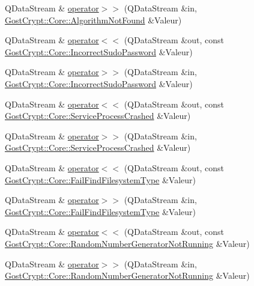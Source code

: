 \begin{DoxyCompactItemize}
\item 
Q\+Data\+Stream \& \hyperlink{namespace_gost_crypt_1_1_core_a18a2f5fd0b2a079c8cbcbccd1177e312}{operator$>$$>$} (Q\+Data\+Stream \&in, \hyperlink{class_gost_crypt_1_1_core_1_1_algorithm_not_found}{Gost\+Crypt\+::\+Core\+::\+Algorithm\+Not\+Found} \&Valeur)
\item 
Q\+Data\+Stream \& \hyperlink{namespace_gost_crypt_1_1_core_acb630df5e59edeeb348987205d80bb44}{operator$<$$<$} (Q\+Data\+Stream \&out, const \hyperlink{class_gost_crypt_1_1_core_1_1_incorrect_sudo_password}{Gost\+Crypt\+::\+Core\+::\+Incorrect\+Sudo\+Password} \&Valeur)
\item 
Q\+Data\+Stream \& \hyperlink{namespace_gost_crypt_1_1_core_a9ef0e1421bd8045e289d3b18faf6408f}{operator$>$$>$} (Q\+Data\+Stream \&in, \hyperlink{class_gost_crypt_1_1_core_1_1_incorrect_sudo_password}{Gost\+Crypt\+::\+Core\+::\+Incorrect\+Sudo\+Password} \&Valeur)
\item 
Q\+Data\+Stream \& \hyperlink{namespace_gost_crypt_1_1_core_aebe7e5d89d4f30fe269355cbec216c97}{operator$<$$<$} (Q\+Data\+Stream \&out, const \hyperlink{class_gost_crypt_1_1_core_1_1_service_process_crashed}{Gost\+Crypt\+::\+Core\+::\+Service\+Process\+Crashed} \&Valeur)
\item 
Q\+Data\+Stream \& \hyperlink{namespace_gost_crypt_1_1_core_a81fbedf03a993369d1f2e0d6d5a954e5}{operator$>$$>$} (Q\+Data\+Stream \&in, \hyperlink{class_gost_crypt_1_1_core_1_1_service_process_crashed}{Gost\+Crypt\+::\+Core\+::\+Service\+Process\+Crashed} \&Valeur)
\item 
Q\+Data\+Stream \& \hyperlink{namespace_gost_crypt_1_1_core_a0d293c1dffa157e3a6f62e0badb1515c}{operator$<$$<$} (Q\+Data\+Stream \&out, const \hyperlink{class_gost_crypt_1_1_core_1_1_fail_find_filesystem_type}{Gost\+Crypt\+::\+Core\+::\+Fail\+Find\+Filesystem\+Type} \&Valeur)
\item 
Q\+Data\+Stream \& \hyperlink{namespace_gost_crypt_1_1_core_a2182019d17693ac4d96b01b5a7adf6b6}{operator$>$$>$} (Q\+Data\+Stream \&in, \hyperlink{class_gost_crypt_1_1_core_1_1_fail_find_filesystem_type}{Gost\+Crypt\+::\+Core\+::\+Fail\+Find\+Filesystem\+Type} \&Valeur)
\item 
Q\+Data\+Stream \& \hyperlink{namespace_gost_crypt_1_1_core_a703b460220aa13a9f8e795109f73820c}{operator$<$$<$} (Q\+Data\+Stream \&out, const \hyperlink{class_gost_crypt_1_1_core_1_1_random_number_generator_not_running}{Gost\+Crypt\+::\+Core\+::\+Random\+Number\+Generator\+Not\+Running} \&Valeur)
\item 
Q\+Data\+Stream \& \hyperlink{namespace_gost_crypt_1_1_core_a17bf25856ad6aaec42e7c4b5a68f773a}{operator$>$$>$} (Q\+Data\+Stream \&in, \hyperlink{class_gost_crypt_1_1_core_1_1_random_number_generator_not_running}{Gost\+Crypt\+::\+Core\+::\+Random\+Number\+Generator\+Not\+Running} \&Valeur)

\end{DoxyCompactItemize}
